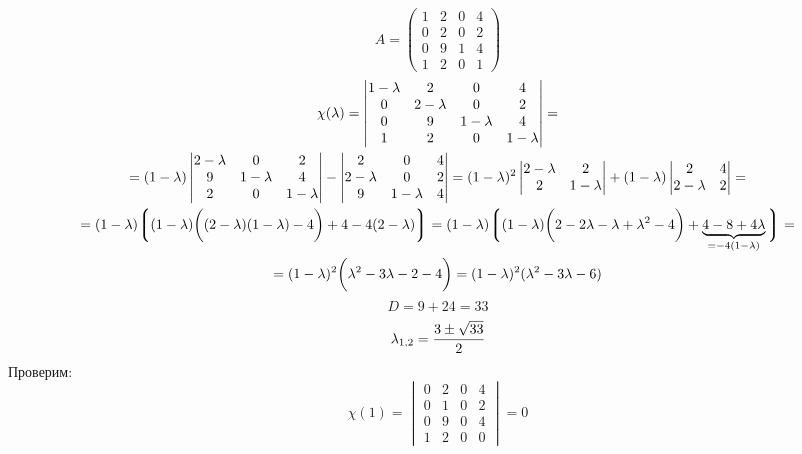 $$ A =
\begin{pmatrix}
	1 & 2 & 0 & 4 \\
    0 & 2 & 0 & 2 \\
    0 & 9 & 1 & 4 \\
    1 & 2 & 0 & 1
\end{pmatrix} $$
\begin{multline*}
	\chi(\lambda) =
    \begin{vmatrix}
    	1 - \lambda & 2 & 0 & 4 \\
        0 & 2 - \lambda & 0 & 2 \\
        0 & 9 & 1 - \lambda & 4 \\
        1 & 2 & 0 & 1 - \lambda
    \end{vmatrix} = \\
    = (1 - \lambda)
    \begin{vmatrix}
    	2 - \lambda & 0 & 2 \\
        9 & 1 - \lambda & 4 \\
        2 & 0 & 1 - \lambda
    \end{vmatrix} -
    \begin{vmatrix}
    	2 & 0 & 4 \\
        2 - \lambda & 0 & 2 \\
        9 & 1 - \lambda & 4
    \end{vmatrix} = (1 - \lambda)^2
    \begin{vmatrix}
    	2 - \lambda & 2 \\
        2 & 1 - \lambda
    \end{vmatrix} + (1 - \lambda)
    \begin{vmatrix}
    	2 & 4 \\
        2 - \lambda & 2
    \end{vmatrix} = \\
    = (1 - \lambda) \bigg\lgroup (1 - \lambda) \bigg( (2 - \lambda)(1 - \lambda) - 4 \bigg) + 4 - 4(2 - \lambda) \bigg\rgroup = (1 - \lambda) \bigg\lgroup (1 - \lambda) \bigg( 2 - 2\lambda - \lambda + \lambda^2 - 4 \bigg) + \underbrace{4 - 8 + 4\lambda}_{= -4(1 - \lambda)} \bigg\rgroup = \\
    = (1 - \lambda)^2 \bigg( \lambda^2 - 3\lambda - 2 - 4 \bigg) = (1 - \lambda)^2(\lambda^2 - 3\lambda - 6)
\end{multline*}
$$ D = 9 + 24 = 33 $$
$$ \lambda_{1,2} = \half[3 \pm \sqrt{33}] $$
Проверим:
$$ \chi(1) =
\begin{vmatrix}
	0 & 2 & 0 & 4 \\
    0 & 1 & 0 & 2 \\
    0 & 9 & 0 & 4 \\
    1 & 2 & 0 & 0
\end{vmatrix} = 0 $$
